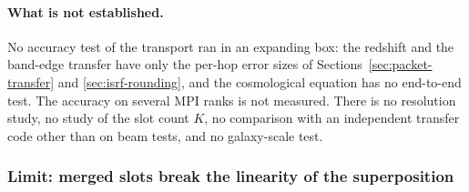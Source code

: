 \paragraph{What is not established.} No accuracy test of the transport ran in
an expanding box: the redshift and the band-edge transfer have only the
per-hop error sizes of Sections~\ref{sec:packet-transfer} and
\ref{sec:isrf-rounding}, and the cosmological equation has no end-to-end test.
The accuracy on several MPI ranks is not measured. There is no resolution
study, no study of the slot count $K$, no comparison with an independent
transfer code other than on beam tests, and no galaxy-scale test.

\subsubsection{Limit: merged slots break the linearity of the superposition}
\label{sec:packet-superposition}

